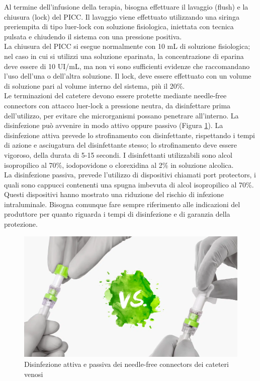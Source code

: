 Al termine dell’infusione della terapia, bisogna effettuare il lavaggio (flush) e la chiusura (lock) del PICC.
Il lavaggio viene effettuato utilizzando una siringa preriempita di tipo luer-lock con soluzione fisiologica, 
iniettata con tecnica pulsata e chiudendo il sistema con una pressione positiva.\\ La chiusura del PICC si esegue 
normalmente con 10 mL di soluzione fisiologica; nel caso in cui si utilizzi una soluzione eparinata, la 
concentrazione di eparina deve essere di 10 UI/mL, ma non vi sono sufficienti evidenze che raccomandano l’uso 
dell’una o dell’altra soluzione. 
Il lock, deve essere effettuato con un volume di soluzione pari al volume interno del sistema, più il 20\%.\\
Le terminazioni del catetere devono essere protette mediante needle-free connectors con attacco luer-lock a pressione 
neutra, da disinfettare prima dell’utilizzo, per evitare che microrganismi possano penetrare 
all’interno. La disinfezione può avvenire in modo attivo oppure passivo (Figura \ref{fig:FIGURE_4.11}). 
La disinfezione attiva prevede lo strofinamento con disinfettante, rispettando i tempi di azione e asciugatura del 
disinfettante stesso; lo strofinamento deve essere vigoroso, della durata di 5-15 secondi. I disinfettanti 
utilizzabili sono alcol isopropilico al 70\%, iodopovidone o clorexidina al 2\% in soluzione alcolica\cite{AIOMCVC}.\\
La disinfezione passiva, prevede l’utilizzo di dispositivi chiamati port protectors, 
i quali sono cappucci contenenti una spugna imbevuta di alcol isopropilico al 70\%. 
Questi dispositivi hanno mostrato una riduzione del rischio di 
infezione intraluminale. Bisogna comunque fare sempre riferimento alle indicazioni del produttore per quanto 
riguarda i tempi di disinfezione e di garanzia della protezione\cite{AIOMCVC}.

\begin{figure}[H]
    \begin{center}
    \includegraphics[width=0.5\columnwidth]{img/converted.png}
    \vspace{-3mm}
    \end{center}
    \caption{Disinfezione attiva e passiva dei needle-free connectors dei cateteri venosi
    \cite{img47BIS}}
    \label{fig:FIGURE_4.11}
\end{figure}

